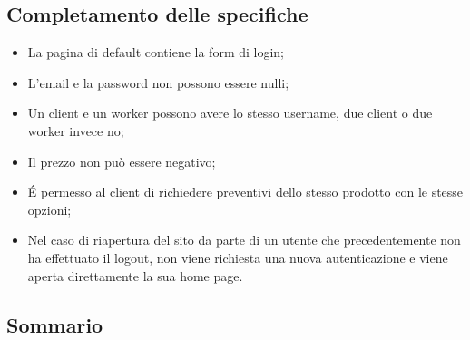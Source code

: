 \documentclass[a4paper, 12pt]{article}
\begin{document}
\subsection{Completamento delle specifiche}
\begin{itemize}
	\item La pagina di default contiene la form di login;
	\item L'email e la password non possono essere nulli;
	\item Un client e un worker possono avere lo stesso username, due client o due worker invece no;
	\item Il prezzo non può essere negativo;
	\item \'E permesso al client di richiedere preventivi dello stesso prodotto con le stesse opzioni;
	\item Nel caso di riapertura del sito da parte di un utente che precedentemente non ha effettuato il logout, non viene richiesta una nuova autenticazione e viene aperta direttamente la sua home page.
\end{itemize}
\subsection{Sommario}
\end{document}
